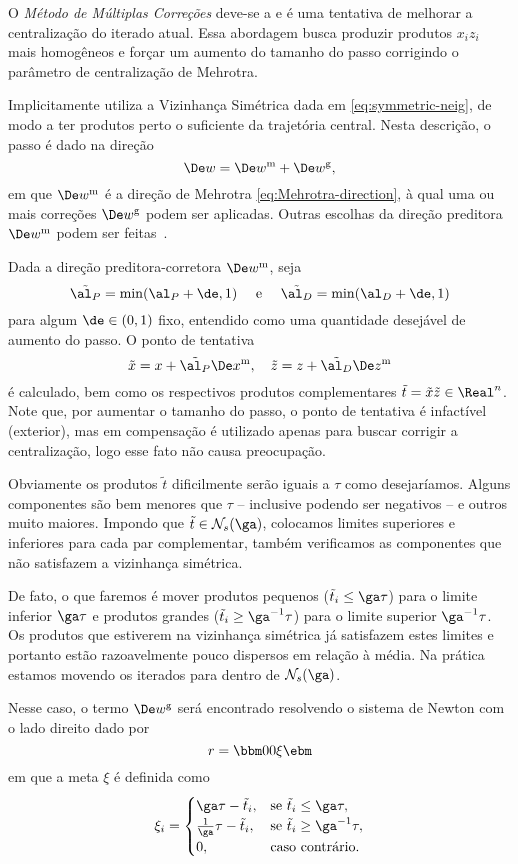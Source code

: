 O \emph{Método de Múltiplas Correções} deve-se a
\textcite{Gondzio:1996uw} e é uma tentativa de melhorar a centralização do iterado
atual. Essa abordagem busca produzir produtos $x_iz_i$ mais homogêneos e forçar
um aumento do tamanho do passo corrigindo o parâmetro de centralização de
Mehrotra.

Implicitamente \textcite{Gondzio:1996uw} utiliza a Vizinhança Simétrica dada 
em \eqref{eq:symmetric-neig}, de modo a ter produtos perto o suficiente da
trajetória central. Nesta descrição, o passo é dado na direção
\[
\Dew = 	\DeMew + \DeMuw,
\]
em que $\DeMew$ é a direção de Mehrotra \eqref{eq:Mehrotra-direction}, à qual
uma ou mais correções $\DeMuw$ podem ser aplicadas. Outras escolhas da direção preditora 
$\DeMew$ podem ser
feitas~\cite{Colombo:2008ia}.

Dada a direção preditora-corretora $\DeMew$, seja \[ \tilde{\al_P} =
\min(\al_P+\de, 1) \quad\text{ e }\quad\tilde{\al_D} = \min(\al_D+\de, 1) \]
para algum $\de\in(0,1)$ fixo, entendido como uma quantidade desejável de
aumento do passo. O ponto de tentativa \[
\tilde{x} = x +  \tilde{\al_P} \DeMex,\quad\tilde{z} = z +  \tilde{\al_D}
\DeMez \] é calculado, bem como os respectivos produtos complementares $\tilde{t} =
\tilde{x}\tilde{z}\in\Real^n$. Note que, por aumentar o tamanho do passo, o
ponto de tentativa é infactível (exterior), mas em compensação é utilizado apenas
para buscar corrigir a centralização,  logo esse fato não causa preocupação.

Obviamente os produtos $\tilde{t}$ dificilmente serão iguais a $\tau$ como
desejaríamos. Alguns componentes são bem menores que $\tau$ -- inclusive
podendo ser negativos -- e outros muito maiores. Impondo que
$\tilde{t}\in\Nset_s(\ga)$, colocamos limites superiores e inferiores para cada
par complementar, também verificamos as componentes que não satisfazem a
vizinhança simétrica. 

De fato, o que faremos é  mover produtos pequenos
($\tilde{t}_i\leq \ga\tau$) para o limite inferior $\ga\tau$ e produtos grandes
($\tilde{t}_i\geq \ga^{-1}\tau$) para o limite superior $\ga^{-1}\tau$. Os
produtos que estiverem na vizinhança simétrica já satisfazem estes limites e
portanto estão razoavelmente pouco dispersos em relação à média. Na prática
estamos movendo os iterados para dentro de $\Nset_s(\ga)$.


Nesse caso, o termo $\DeMuw$ será encontrado resolvendo o sistema de Newton
com o lado direito dado por
\begin{equation}
\label{eq:multiply-correctors-rhs}
r = \bbm 0\\ 0\\ \xi\ebm
\end{equation}
em que a meta $\xi$ é definida como
\[
\xi_i = 
\begin{cases}
\ga\tau - \tilde{t}_i, & \text{se } \tilde{t}_i\leq \ga\tau,\\
\frac{1}{\ga}\tau -
\tilde{t}_i, & \text{se } \tilde{t}_i\geq \ga^{-1}\tau,\\ 
0, & \text{caso contrário}.
\end{cases}
\]

